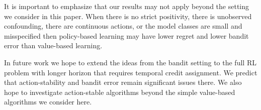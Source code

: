 It is important to emphasize that our results may not apply beyond the setting we consider in this paper. When there is no strict positivity, there is unobserved confounding, there are continuous actions, or the model classes are small and misspecified then policy-based learning may have lower regret and lower bandit error than value-based learning.

In future work we hope to extend the ideas from the bandit setting to the full RL problem with longer horizon that requires temporal credit assignment. We predict that action-stability and bandit error remain significant issues there.
We also hope to investigate action-stable algorithms beyond the simple value-based algorithms we consider here.

\printendnotes
